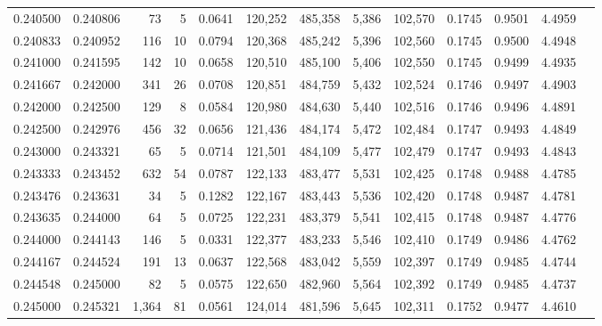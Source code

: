 \begin{tabular}{rrrrrrrrrrrrr}
0.240500 & 0.240806 &    73 &   5 &                                     0.0641 & 120,252 & 485,358 &   5,386 & 102,570 & 0.1745 & 0.9501 & 4.4959 \\
0.240833 & 0.240952 &   116 &  10 &                                     0.0794 & 120,368 & 485,242 &   5,396 & 102,560 & 0.1745 & 0.9500 & 4.4948 \\
0.241000 & 0.241595 &   142 &  10 &                                     0.0658 & 120,510 & 485,100 &   5,406 & 102,550 & 0.1745 & 0.9499 & 4.4935 \\
0.241667 & 0.242000 &   341 &  26 &                                     0.0708 & 120,851 & 484,759 &   5,432 & 102,524 & 0.1746 & 0.9497 & 4.4903 \\
0.242000 & 0.242500 &   129 &   8 &                                     0.0584 & 120,980 & 484,630 &   5,440 & 102,516 & 0.1746 & 0.9496 & 4.4891 \\
0.242500 & 0.242976 &   456 &  32 &                                     0.0656 & 121,436 & 484,174 &   5,472 & 102,484 & 0.1747 & 0.9493 & 4.4849 \\
0.243000 & 0.243321 &    65 &   5 &                                     0.0714 & 121,501 & 484,109 &   5,477 & 102,479 & 0.1747 & 0.9493 & 4.4843 \\
0.243333 & 0.243452 &   632 &  54 &                                     0.0787 & 122,133 & 483,477 &   5,531 & 102,425 & 0.1748 & 0.9488 & 4.4785 \\
0.243476 & 0.243631 &    34 &   5 &                                     0.1282 & 122,167 & 483,443 &   5,536 & 102,420 & 0.1748 & 0.9487 & 4.4781 \\
0.243635 & 0.244000 &    64 &   5 &                                     0.0725 & 122,231 & 483,379 &   5,541 & 102,415 & 0.1748 & 0.9487 & 4.4776 \\
0.244000 & 0.244143 &   146 &   5 &                                     0.0331 & 122,377 & 483,233 &   5,546 & 102,410 & 0.1749 & 0.9486 & 4.4762 \\
0.244167 & 0.244524 &   191 &  13 &                                     0.0637 & 122,568 & 483,042 &   5,559 & 102,397 & 0.1749 & 0.9485 & 4.4744 \\
0.244548 & 0.245000 &    82 &   5 &                                     0.0575 & 122,650 & 482,960 &   5,564 & 102,392 & 0.1749 & 0.9485 & 4.4737 \\
0.245000 & 0.245321 & 1,364 &  81 &                                     0.0561 & 124,014 & 481,596 &   5,645 & 102,311 & 0.1752 & 0.9477 & 4.4610 \\

\end{tabular}
